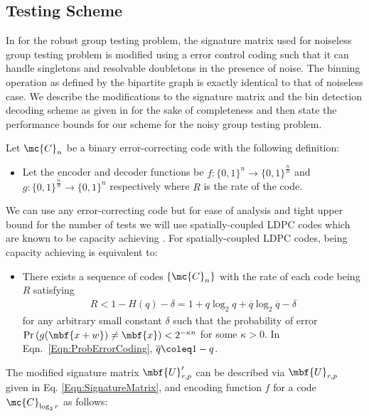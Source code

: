 \documentclass[conference,,twocolumn]{IEEEtran}
\begin{document}
\subsection*{Testing Scheme}
In \cite{lee2015saffron} for the robust group testing problem, the signature matrix used for noiseless group testing problem is modified using a error control coding such that it can handle singletons and resolvable doubletons in the presence of noise. The binning operation as defined by the bipartite graph is exactly identical to that of noiseless case. We describe the modifications to the signature matrix and the bin detection decoding scheme as given in \cite{lee2015saffron} for the sake of completeness and then state the performance bounds for our scheme for the noisy group testing problem.

Let $\mc{C}_n$ be a binary error-correcting code with the following definition:
\begin{itemize}
\item Let the encoder and decoder functions be $f:\{0,1\}^{n}\rightarrow \{0,1\}^{\frac{n}{R}}$ and $g:\{0,1\}^{\frac{n}{R}}\rightarrow \{0,1\}^{n}$ respectively where $R$ is the rate of the code.
\end{itemize}
We can use any error-correcting code but for ease of analysis and tight upper bound for the number of tests we will use spatially-coupled LDPC codes which are known to be capacity achieving \cite{kumar2014threshold,kudekar2013spatially}. For spatially-coupled LDPC codes, being capacity achieving is equivalent to: 
\begin{itemize}
\item There exists a sequence of codes $\{\mc{C}_n\}$ with the rate of each code being $R$ satisfying 
\begin{align}
\label{Eqn:ProbErrorCoding}
R<1-H(q)-\delta=1+q\log_2 q+ \overline{q}\log_2\overline{q}-\delta
\end{align}
for any arbitrary small constant $\delta$ such that the probability of error $\text{Pr}\left(g(\mbf{x+w})\neq \mbf{x}\right)<2^{-\kappa n}$ for some $\kappa >0$. In Eqn.~\ref{Eqn:ProbErrorCoding}, $\overline{q}\coleq 1-q$. 
\end{itemize} 
The modified signature matrix $\mbf{U}'_{r,p}$ can be described via $\mbf{U}_{r, p}$ given in Eq. \eqref{Eqn:SignatureMatrix}, and encoding function $f$ for a code $\mc{C}_{\log_2 r}$ as follows:
\end{document}
